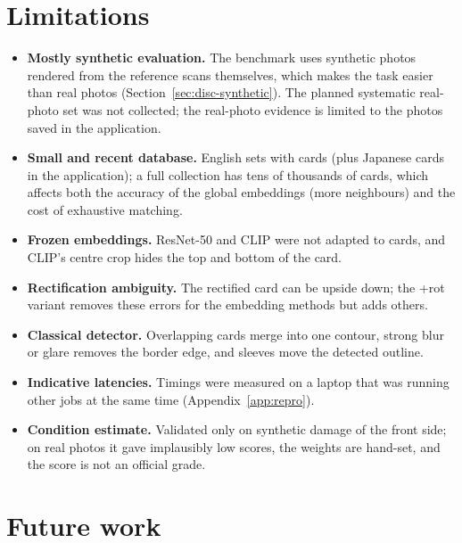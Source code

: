 \section{Limitations}

\begin{itemize}
  \item \textbf{Mostly synthetic evaluation.} The benchmark uses synthetic photos rendered from the reference scans themselves, which makes the task easier than real photos (Section~\ref{sec:disc-synthetic}). The planned systematic real-photo set was not collected; the real-photo evidence is limited to the  photos saved in the application.
  \item \textbf{Small and recent database.}  English sets with  cards (plus  Japanese cards in the application); a full collection has tens of thousands of cards, which affects both the accuracy of the global embeddings (more neighbours) and the cost of exhaustive matching.
  \item \textbf{Frozen embeddings.} ResNet-50 and CLIP were not adapted to cards, and CLIP's centre crop hides the top and bottom of the card.
  \item \textbf{Rectification ambiguity.} The rectified card can be upside down; the +rot variant removes these errors for the embedding methods but adds others.
  \item \textbf{Classical detector.} Overlapping cards merge into one contour, strong blur or glare removes the border edge, and sleeves move the detected outline.
  \item \textbf{Indicative latencies.} Timings were measured on a laptop that was running other jobs at the same time (Appendix~\ref{app:repro}).
  \item \textbf{Condition estimate.} Validated only on synthetic damage of the front side; on real photos it gave implausibly low scores, the weights are hand-set, and the score is not an official grade.
\end{itemize}

\section{Future work}

